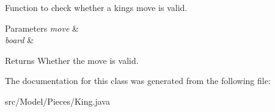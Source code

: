 Function to check whether a king\textquotesingle{}s move is valid. 
\begin{DoxyParams}{Parameters}
{\em move} & \\
\hline
{\em board} & \\
\hline
\end{DoxyParams}
\begin{DoxyReturn}{Returns}
Whether the move is valid. 
\end{DoxyReturn}


The documentation for this class was generated from the following file\+:\begin{DoxyCompactItemize}
\item 
src/\+Model/\+Pieces/King.\+java\end{DoxyCompactItemize}
